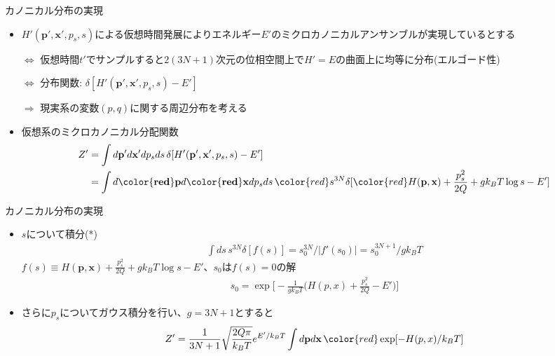 \begin{frame}[t,fragile]{カノニカル分布の実現}
  \begin{itemize}
  \item $H'(\mathbf{p}',\mathbf{x}',p_s,s)$による仮想時間発展によりエネルギー$E'$のミクロカノニカルアンサンブルが実現しているとする

    $\Leftrightarrow$ 仮想時間$t'$でサンプルすると$2(3N+1)$次元の位相空間上で$H'=E$の曲面上に均等に分布(エルゴード性)
    
    $\Leftrightarrow$ 分布関数: $\delta [ H'(\mathbf{p}',\mathbf{x}',p_s,s) - E']$
    
    $\Rightarrow$ 現実系の変数$(p,q)$に関する周辺分布を考える
  \item 仮想系のミクロカノニカル分配関数
    \begin{align*}
      Z'&=\int d\mathbf{p}' d\mathbf{x}' dp_s ds \, \delta [ H'(\mathbf{p}',\mathbf{x}',p_s,s) - E'] \\
      &=\int d\mathbf{{\color{red}p}} d\mathbf{{\color{red}x}} dp_s ds \, {\color{red}s^{3N}} \delta [ {\color{red}H(\mathbf{p},\mathbf{x})} + \frac{p_s^2}{2Q} + g k_B T \log s - E']
    \end{align*}
  \end{itemize}
\end{frame}

\begin{frame}[t,fragile]{カノニカル分布の実現}
  \begin{itemize}
  \item $s$について積分(*)
    \begin{align*}
      \int ds \, s^{3N} \delta[f(s)] = s_0^{3N} / | f'(s_0) | = s_0^{3N+1} / g k_B T
    \end{align*}
    $f(s) \equiv H(\mathbf{p},\mathbf{x}) + \frac{p_s^2}{2Q} + g k_B T \log s - E'$、$s_0$は$f(s)=0$の解
    \begin{align*}
      s_0 = \exp \Big[ -\frac{1}{gk_BT} \Big( H(p,x) + \frac{p_s^2}{2Q} - E' \Big) \Big]
    \end{align*}
  \item さらに$p_s$についてガウス積分を行い、$g=3N+1$とすると
    \begin{align*}
      Z' = \frac{1}{3N+1} \sqrt{\frac{2Q\pi}{k_BT}} e^{E'/k_BT} \int d\mathbf{p}d\mathbf{x} \, {\color{red}\exp [- H(p,x)/k_BT ]}
    \end{align*}
  \end{itemize}
\end{frame}


